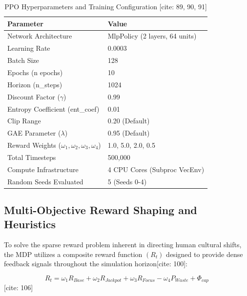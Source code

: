 \documentclass[conference]{IEEEtran}
\begin{document}
\begin{table}[htbp]
\caption{PPO Hyperparameters and Training Configuration [cite: 89, 90, 91]}
\begin{center}
\begin{tabular}{|l|l|}
\hline
\textbf{Parameter} & \textbf{Value} \\
\hline
Network Architecture & MlpPolicy (2 layers, 64 units) \\
Learning Rate & 0.0003 \\
Batch Size & 128 \\
Epochs (n epochs) & 10 \\
Horizon (n\_steps) & 1024 \\
Discount Factor ($\gamma$) & 0.99 \\
Entropy Coefficient (ent\_coef) & 0.01 \\
Clip Range & 0.20 (Default) \\
GAE Parameter ($\lambda$) & 0.95 (Default) \\
Reward Weights ($\omega_1, \omega_2, \omega_3, \omega_4$) & 1.0, 5.0, 2.0, 0.5 \\
Total Timesteps & 500,000 \\
Compute Infrastructure & 4 CPU Cores (Subproc VecEnv) \\
Random Seeds Evaluated & 5 (Seeds 0-4) \\
\hline
\end{tabular}
\end{center}
\end{table}

\subsection{Multi-Objective Reward Shaping and Heuristics}
To solve the sparse reward problem inherent in directing human cultural shifts, the MDP utilizes a composite reward function $(R_{t})$ designed to provide dense feedback signals throughout the simulation horizon[cite: 100]:

\begin{equation}
R_{t}=\omega_{1}R_{Base}+\omega_{2}R_{Jackpot}+\omega_{3}R_{Focus}-\omega_{4}P_{Waste}+\Phi_{cap} \label{eq:3}
\end{equation}
[cite: 106]
\end{document}
